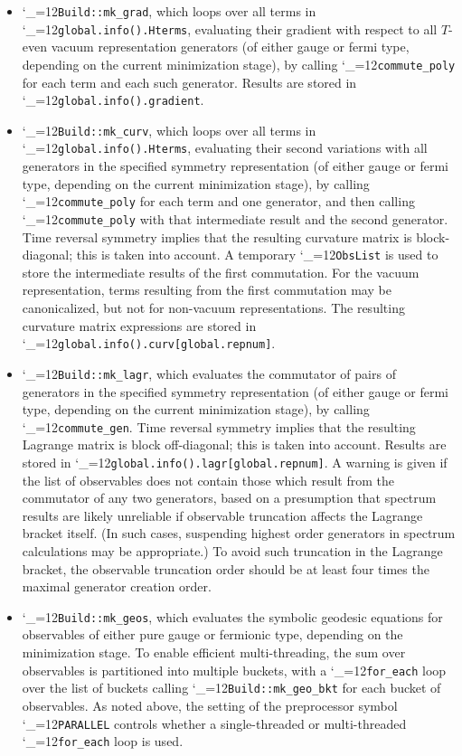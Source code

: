 \documentclass [12pt]{article}
\makeatletter
\renewcommand{\tt}{\begingroup\catcode`_=12\def\_{\string_}\tt@}
\newcommand{\tt@}[1]{\texttt{#1}\endgroup}
\makeatother
\begin{document}
\begin{itemize}
\item
    \tt{Build::mk_grad}, which loops over all terms
    in \tt{global.info().Hterms}, evaluating their
    gradient with respect to all $T$-even vacuum
    representation generators
    (of either gauge or fermi type, depending on the current
    minimization stage), by calling
    \tt{commute_poly} for each term and each such generator.
    Results are stored in \tt{global.info().gradient}.

\item
    \tt{Build::mk_curv},
    which loops over all terms
    in \tt{global.info().Hterms}, evaluating their
    second variations with all generators
    in the specified symmetry representation
    (of either gauge or fermi type, depending on the current
    minimization stage),
    by calling \tt{commute_poly} for each term and one generator,
    and then calling \tt{commute_poly} with that intermediate
    result and the second generator.
    Time reversal symmetry implies that the resulting curvature
    matrix is block-diagonal; this is taken into account.
    A temporary \tt{ObsList} is used to store the intermediate
    results of the first commutation.
    For the vacuum representation,
    terms resulting from the first commutation may be canonicalized,
    but not for non-vacuum representations.
    The resulting curvature matrix expressions
    are stored in
    \tt{global.info().curv[global.repnum]}.

\item
    \tt{Build::mk_lagr},
    which evaluates the commutator of pairs of generators
    in the specified symmetry representation
    (of either gauge or fermi type, depending on the current
    minimization stage),
    by calling \tt{commute_gen}.
    Time reversal symmetry implies that the resulting Lagrange
    matrix is block off-diagonal; this is taken into account.
    Results are stored in \tt{global.info().lagr[global.repnum]}.
    A warning is given if
    the list of observables does not contain those which result
    from the commutator of any two generators, based on a presumption
    that spectrum results are likely unreliable
    if observable truncation affects the Lagrange bracket itself.
    (In such cases, suspending highest order generators in
    spectrum calculations may be appropriate.)
    To avoid such truncation in the Lagrange bracket,
    the observable truncation order should be
    at least four times the maximal generator creation order.

\item
    \tt{Build::mk_geos}, which evaluates the
    symbolic geodesic equations for observables
    of either pure gauge or fermionic type,
    depending on the minimization stage.
    To enable efficient multi-threading,
    the sum over observables is partitioned into
    multiple buckets, with a \tt{for_each} loop
    over the list of buckets calling
    \tt{Build::mk_geo_bkt} for each bucket of observables.
    As noted above, the setting of the preprocessor
    symbol \tt{PARALLEL} controls whether a
    single-threaded or multi-threaded \tt{for_each} loop
    is used.


\end{itemize}
\end{document}
